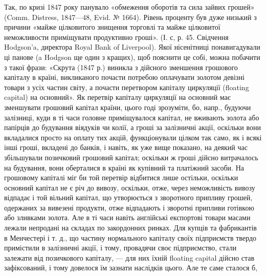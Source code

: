 Так, по кризі 1847 року панувало «обмеження оборотів та сила зайвих
грошей» (Comm. Distress, 1847—48, Evid. № 1664). Рівень проценту був дуже
низький з причини «майже цілковитого знищення торговлі та майже цілковитої
неможливости приміщувати продуктивно гроші». (І. с, р. 45. Свідчення Hodgson’a,
директора Royal Bank of Liverpool). Якої нісенітниці понавигадували ці панове
(a Hodgson ще один з кращих), щоб пояснити це собі, можна побачити з такої
фрази: «Скрута (1847 р.) виникла з дійсного зменшення грошового капіталу
в країні, викликаного почасти потребою оплачувати золотом девізні товари
з усіх частин світу, а почасти перетвором капіталу циркуляції (floating capital)
на основний». Як перетвір капіталу циркуляції на основний має зменшувати
грошовий капітал країни, цього годі зрозуміти, бо, напр., будуючи залізниці,
куди в ті часи головне приміщувалося капітал, не вживають золота або папірців
до будування віядуків чи колії, а гроші за залізничні акції, оскільки вони
вкладалися просто на оплату тих акцій, функціонували цілком так само, як
і всякі інші гроші, вкладені до банків, і навіть, як уже вище показано, на
деякий час збільшували позичковий грошовий капітал; оскільки ж гроші дійсно
витрачалось на будування, вони оберталися в країні як купівний та платіжний
засоби. На грошовому капіталі міг би той перетвір відбитися лише остільки,
оскільки основний капітал не є річ до вивозу, оскільки, отже, через неможливість
вивозу відпадає і той вільний капітал, що утворюється з зворотного припливу грошей,
одержаних за вивезені продукти, отже відпадають і зворотні припливи готівкою
або зливками золота. Але в ті часи навіть англійські експортові товари масами
лежали непродані на складах по закордонних ринках. Для купців та фабрикантів
в Менчестері і т. д., що частину нормального капіталу своїх підприємств твердо
примістили в залізничні акції, і тому, провадячи своє підприємство, стали
залежати від позичкового капіталу, — для них їхній floating capital дійсно став
зафіксований, і тому довелося їм зазнати наслідків цього. Але те саме сталося б,
\parbreak{}  %
